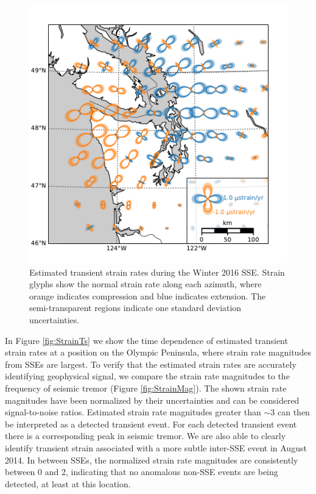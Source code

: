 \documentclass[10pt,letter]{article}
\begin{document}
\begin{figure}
\includegraphics{figures/strain_map/strain-map.pdf}
\caption{Estimated transient strain rates during the Winter 2016 SSE. Strain glyphs show the normal strain rate along each azimuth, where orange indicates compression and blue indicates extension. The semi-transparent regions indicate one standard deviation uncertainties.}   
\label{fig:StrainMap}
\end{figure}

In Figure \ref{fig:StrainTs} we show the time dependence of estimated transient strain rates at a position on the Olympic Peninsula, where strain rate magnitudes from SSEs are largest. To verify that the estimated strain rates are accurately identifying geophysical signal, we compare the strain rate magnitudes to the frequency of seismic tremor (Figure \ref{fig:StrainMag}). The shown strain rate magnitudes have been normalized by their uncertainties and can be considered signal-to-noise ratios. Estimated strain rate magnitudes greater than ${\sim}3$ can then be interpreted as a detected transient event. For each detected transient event there is a corresponding peak in seismic tremor. We are also able to clearly identify transient strain associated with a more subtle inter-SSE event in August 2014. In between SSEs, the normalized strain rate magnitudes are consistently between 0 and 2, indicating that no anomalous non-SSE events are being detected, at least at this location. 
\end{document}
